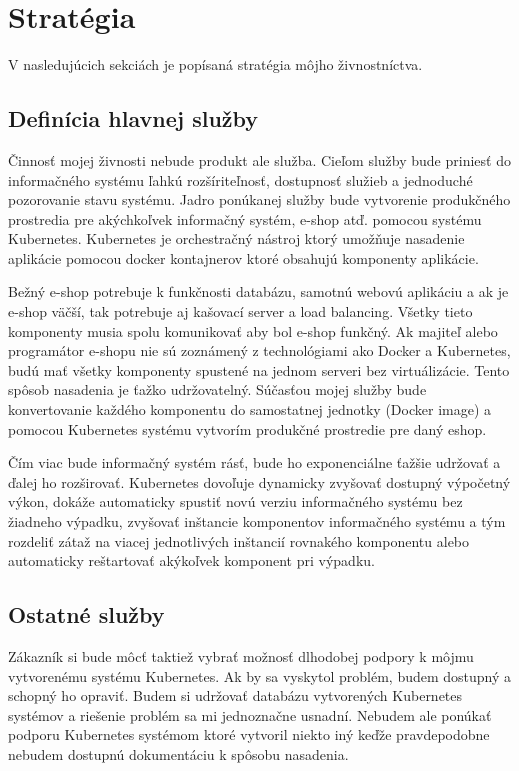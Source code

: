 \chapter{Stratégia}

V nasledujúcich sekciách je popísaná stratégia môjho živnostníctva.

\section{Definícia hlavnej služby}
Činnosť mojej živnosti nebude produkt ale služba. Cieľom služby bude priniesť do informačného systému ľahkú rozšíriteľnosť, dostupnosť služieb a jednoduché pozorovanie stavu systému. Jadro ponúkanej služby bude vytvorenie produkčného prostredia pre akýchkoľvek informačný systém, e-shop atď. pomocou systému Kubernetes. Kubernetes je orchestračný nástroj ktorý umožňuje nasadenie aplikácie pomocou docker kontajnerov ktoré obsahujú komponenty aplikácie.

Bežný e-shop potrebuje k funkčnosti databázu, samotnú webovú aplikáciu a ak je e-shop väčší, tak potrebuje aj kašovací server a load balancing. Všetky tieto komponenty musia spolu komunikovať aby bol e-shop funkčný. Ak majiteľ alebo programátor e-shopu nie sú zoznámený z technológiami ako Docker a Kubernetes, budú mať všetky komponenty spustené na jednom serveri bez virtuálizácie. Tento spôsob nasadenia je ťažko udržovatelný. Súčasťou mojej služby bude konvertovanie každého komponentu do samostatnej jednotky (Docker image) a pomocou Kubernetes systému vytvorím produkčné prostredie pre daný eshop.

Čím viac bude informačný systém rásť, bude ho exponenciálne ťažšie udržovať a ďalej ho rozširovať. Kubernetes dovoľuje dynamicky zvyšovať dostupný výpočetný výkon, dokáže automaticky spustiť novú verziu informačného systému bez žiadneho výpadku, zvyšovať inštancie komponentov informačného systému a tým rozdeliť zátaž na viacej jednotlivých inštancií rovnakého komponentu alebo automaticky reštartovať akýkoľvek komponent pri výpadku. 

\section{Ostatné služby}

Zákazník si bude môcť taktiež vybrať možnosť dlhodobej podpory k môjmu vytvorenému systému Kubernetes. Ak by sa vyskytol problém, budem dostupný a schopný ho opraviť. Budem si udržovať databázu vytvorených Kubernetes systémov a riešenie problém sa mi jednoznačne usnadní. Nebudem ale ponúkať podporu Kubernetes systémom ktoré vytvoril niekto iný keďže pravdepodobne nebudem dostupnú dokumentáciu k spôsobu nasadenia.

